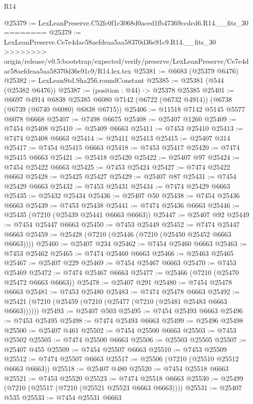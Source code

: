 \begin{lexlean}{R14}
\begin{coremodule}
{{{{{{{{{{{{{{{{{{{{{{{{{{{{{{{{{{{{{{{{{{{{{{{{{{{{{{{{{{{{{{{{{{{{{{{{{{{{{{{{{{@25379 := LexLeanPreserve.C52fc0f1c3068d0aced1fb47369ccdcd6.R14.__fits_30
========
@25379 := LexLeanPreserve.Ce7e4dac58aefdeaa5aa58370d36e91c9.R14.__fits_30
>>>>>>>> origin/release/v0.5:bootstrap/expected/verify/preserve/LexLeanPreserve/Ce7e4dac58aefdeaa5aa58370d36e91c9/R14.lex.tex
@25381 := @6683 (@25379 @6476)
@25382 := LexLeanStd.Sha256.roundConstant
@25385 := @25381 (@544 (@25382 @6476))
@25387 := (position : @44) -> @25378 @25385
@25401 := @6697
    @4914
    @6838
    @25385
    @6080
    @7142
    (@6722 (@6732 @4914))
    (@6738 (@6739 (@6740 @6080) @6838 @6715))
@25406 := @11518 @7142 @5145 @5577 @6078 @6668
@25407 := @7498 @6675
@25408 := @25407 @1260
@25409 := @7454 @25408
@25410 := @25409 @6663
@25411 := @7453 @25410
@25413 := @7474 @25408 @6663
@25414 := @25411 @25413
@25415 := @25407 @314
@25417 := @7454 @25415 @6663
@25418 := @7453 @25417
@25420 := @7474 @25415 @6663
@25421 := @25418 @25420
@25422 := @25407 @97
@25424 := @7454 @25422 @6663
@25425 := @7453 @25424
@25427 := @7474 @25422 @6663
@25428 := @25425 @25427
@25429 := @25407 @87
@25431 := @7454 @25429 @6663
@25432 := @7453 @25431
@25434 := @7474 @25429 @6663
@25435 := @25432 @25434
@25436 := @25407 @50
@25438 := @7454 @25436 @6663
@25439 := @7453 @25438
@25441 := @7474 @25436 @6663
@25446 := @25435 (@7210 (@25439 @25441 @6663 @6663))
@25447 := @25407 @92
@25449 := @7454 @25447 @6663
@25450 := @7453 @25449
@25452 := @7474 @25447 @6663
@25459 := @25428 (@7210 (@25446 (@7210 (@25450 @25452 @6663 @6663))))
@25460 := @25407 @234
@25462 := @7454 @25460 @6663
@25463 := @7453 @25462
@25465 := @7474 @25460 @6663
@25466 := @25463 @25465
@25467 := @25407 @229
@25469 := @7454 @25467 @6663
@25470 := @7453 @25469
@25472 := @7474 @25467 @6663
@25477 := @25466 (@7210 (@25470 @25472 @6663 @6663))
@25478 := @25407 @291
@25480 := @7454 @25478 @6663
@25481 := @7453 @25480
@25483 := @7474 @25478 @6663
@25492 := @25421 (@7210 (@25459 (@7210 (@25477 (@7210 (@25481 @25483 @6663 @6663))))))
@25493 := @25407 @503
@25495 := @7454 @25493 @6663
@25496 := @7453 @25495
@25498 := @7474 @25493 @6663
@25499 := @25496 @25498
@25500 := @25407 @461
@25502 := @7454 @25500 @6663
@25503 := @7453 @25502
@25505 := @7474 @25500 @6663
@25506 := @25503 @25505
@25507 := @25407 @455
@25509 := @7454 @25507 @6663
@25510 := @7453 @25509
@25512 := @7474 @25507 @6663
@25517 := @25506 (@7210 (@25510 @25512 @6663 @6663))
@25518 := @25407 @480
@25520 := @7454 @25518 @6663
@25521 := @7453 @25520
@25523 := @7474 @25518 @6663
@25530 := @25499 (@7210 (@25517 (@7210 (@25521 @25523 @6663 @6663))))
@25531 := @25407 @535
@25533 := @7454 @25531 @6663
}}}}}}}}}}}}}}}}}}}}}}}}}}}}}}}}}}}}}}}}}}}}}}}}}}}}}}}}}}}}}}}}}}}}}}}}}}}}}}}}}}
\end{coremodule}
\end{lexlean}
